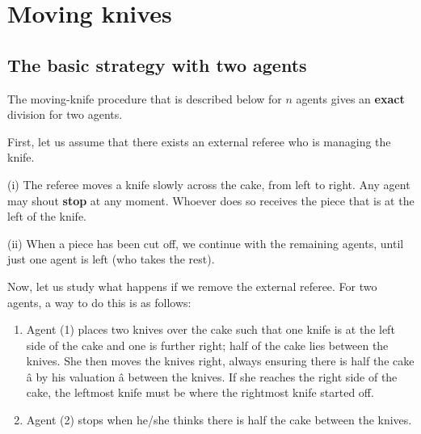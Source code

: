 \section{Moving knives}
\label{sec:movingknives}

\subsection{The basic strategy with two agents}

The moving-knife procedure that is described below for $n$ agents gives an \textbf{exact} division for two agents.

First, let us assume that there exists an external referee who is managing the knife. 


(i) The referee moves a knife slowly across the cake, from left to right. 
Any agent may shout \textbf{stop} at any moment. Whoever does so receives the piece that is at the left of the knife.

(ii) When a piece has been cut off, we continue with the remaining agents, until just one agent is left (who takes the rest).
\bigskip 

Now, let us study what happens if we remove the external referee. 
For two agents, a way to do this is as follows:

\begin{enumerate}
\item 
Agent (1) places two knives over the cake such that one knife is at the left side of the cake and one is further right; 
half of the cake lies between the knives. 
She then moves the knives right, always ensuring there is half the cake â by his valuation â between the knives. 
If she reaches the right side of the cake, the leftmost knife must be where the rightmost knife started off. 
\item Agent (2) stops when he/she thinks there is half the cake between the knives. 
\end{enumerate}
\bigskip

